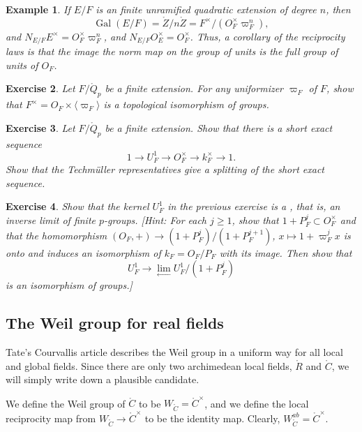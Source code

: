 \documentclass{amsart}
\newtheorem{exercise}{Exercise}
\newtheorem{example}[exercise]{Example}
\def\op#1{{\operatorname{#1}}}
\def\CC{\ring{C}}
\def\RR{\ring{R}}
\def\oG{\op{Gal}}
\begin{document}
\begin{example} If $E/F$ is an finite unramified quadratic extension of degree $n$, then
\[
\oG(E/F) = \ring{Z}/n\ring{Z} = F^\times/(O_F^\times\varpi_F^n),
\]
and $N_{E/F} E^\times = O_F^\times \varpi_F^n$, and $N_{E/F} O_E^\times = O_F^\times$.
Thus, a corollary of the reciprocity laws is that the image the norm map on the group of units
is the full group of units of $O_F$.
\end{example}

\begin{exercise}  Let $F/\ring{Q}_p$ be a finite extension.  For any uniformizer $\varpi_F$
of $F$, show that $F^\times = O_F \times \langle \varpi_F \rangle$ is a topological
isomorphism of groups.
\end{exercise}

\begin{exercise} Let $F/\ring{Q}_p$ be a finite extension.  Show that there is a short
exact sequence
\[
1 \to U_F^1 \to O_F^\times \to k^\times_F\to 1.
\]
Show that the Techm\"uller representatives give a splitting of the short exact sequence.
\end{exercise}

\begin{exercise} Show that the kernel $U_F^1$ in the previous exercise is a ,
that is, an inverse limit of finite $p$-groups.  [Hint:  For each $j\ge 1$, show that
$1+P_F^j\subset O_F^\times$ and that the homomorphism $(O_F,+)\to (1+P_F^j)/(1+P_F^{j+1})$,
 $x\mapsto 1 + \varpi^j_F x$ is onto and
induces an isomorphism of $k_F = O_F/P_F$ with its image. Then show that
\[
U^1_F \to \lim_{\leftarrow} U^1_F/(1+P_F^j)
\]
is an isomorphism of groups.]
\end{exercise}

\subsection{The Weil group for real fields}

Tate's Courvallis article describes the Weil group in a uniform way
for all local and global fields.  Since there are only two archimedean
local fields, $\RR$ and $\CC$, we will simply write down a plausible
candidate.

We define the Weil group of $\CC$ to be $W_{\CC}=\CC^\times$, and we
define the local reciprocity map from $W_{\CC}\to \CC^\times$ to be
the identity map.  Clearly, $W_{\CC}^{ab} = \CC^\times$.
\end{document}
